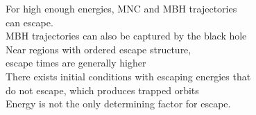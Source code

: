 \documentclass[preview]{standalone}
\begin{document}
For high enough energies, MNC and MBH trajectories\\ can escape.\\MBH trajectories can also be captured by the black hole\\Near regions with ordered escape structure,\\ escape times are generally higher\\There exists initial conditions with escaping energies that\\do not escape, which produces trapped orbits\\Energy is not the only determining factor for escape.\\
\end{document}
